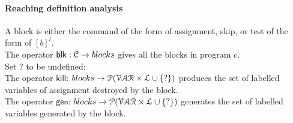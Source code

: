  \paragraph{Reaching definition analysis}
A block  is either the command of the form of assignment, skip, or test of the form of $[b]^{l}$.\\
The operator $\mathsf{blk} : \mathcal{C} \to blocks$ gives all the blocks in program $c$.
\\
 Set $?$ to be undefined:
 \\
The operator $\mathsf{kill}$: $blocks \to \mathcal{P}(\mathcal{VAR} \times \mathcal{L} \cup \{?\})$ produces the set of labelled variables of assignment destroyed by the block.
 \\
  The operator $\mathsf{gen}$: $blocks \to \mathcal{P}(\mathcal{VAR} \times \mathcal{L} \cup \{?\})$ generates the set of labelled variables generated by the block.
  \\
